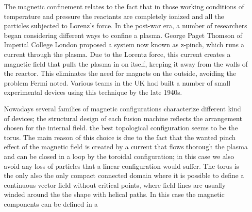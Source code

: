 %
The magnetic confinement relates to the fact that in those working conditions of temperature and pressure the reactants are completely ionized and all the particles subjected to Lorenz's force.
%
In the post-war era, a number of researchers began considering different ways to confine a plasma. George Paget Thomson of Imperial College London proposed a system now known as z-pinch, which runs a current through the plasma. Due to the Lorentz force, this current creates a magnetic field that pulls the plasma in on itself, keeping it away from the walls of the reactor. This eliminates the need for magnets on the outside, avoiding the problem Fermi noted. Various teams in the UK had built a number of small experimental devices using this technique by the late 1940s.







%
Nowadays several families of magnetic configurations characterize different kind of devices; the structural design of each fusion machine reflects the arrangement chosen for the internal field. the best topological configuration seems to be the torus. The main reason of this choice is due to the fact that the wanted pinch effect of the magnetic field is created by a current that flows thorough the plasma and can be closed in a loop by the toroidal configuration; in this case we also avoid any loss of particles that a linear configuration would suffer. The torus is the only also the only compact connected domain where it is possible to define a continuous vector field without critical points,  where field lines are usually winded around the the shape with helical paths. 
In this case the magnetic components can be defined in a 
%


